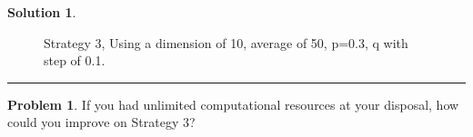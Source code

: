 \documentclass{article}
\theoremstyle{definition}
\newtheorem{problem}{Problem}
\def\fline{\rule{0.75\linewidth}{0.5pt}}
\newcommand{\finishline}{\vspace{-15pt}\begin{center}\fline\end{center}}
\newtheorem*{solution*}{Solution}
\newenvironment{solution}{\begin{solution*}}{{\finishline} \end{solution*}}
\begin{document}
\begin{solution}
    \begin{figure}[h]
	\centering
	\caption{Strategy 3, Using a dimension of 10, average of 50, p=0.3, q with step of 0.1.}
	\end{figure}
    
\end{solution}

\smallskip

\begin{problem}
	If you had unlimited computational resources at your disposal, how could you improve on Strategy 3? 
\end{problem}

\smallskip
\end{document}
